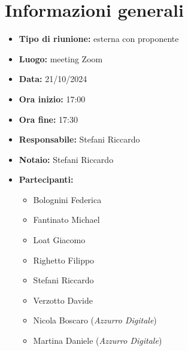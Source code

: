 \section{Informazioni generali}

\begin{itemize}
    \item \textbf{Tipo di riunione:} esterna con proponente
    \item \textbf{Luogo:} meeting Zoom
    \item \textbf{Data:} 21/10/2024
    \item \textbf{Ora inizio:} 17:00
    \item \textbf{Ora fine:} 17:30
    \item \textbf{Responsabile:} Stefani Riccardo
    \item \textbf{Notaio:} Stefani Riccardo
    \item \textbf{Partecipanti:}
    \begin{itemize}
        \renewcommand{\labelitemii}{--}
        \item Bolognini Federica
        \item Fantinato Michael
        \item Loat Giacomo
        \item Righetto Filippo
        \item Stefani Riccardo
        \item Verzotto Davide
        \item Nicola Boscaro (\emph{Azzurro Digitale})
        \item Martina Daniele (\emph{Azzurro Digitale})
    \end{itemize}
\end{itemize}